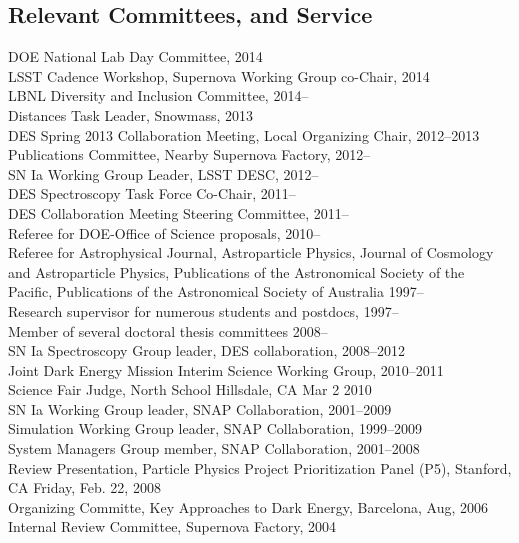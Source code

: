 \documentclass[line, margin]{res}
\begin{document}
\begin{resume}
\section{Relevant Committees, and Service}
DOE National Lab Day Committee, 2014\\
LSST Cadence Workshop, Supernova Working Group co-Chair, 2014\\
LBNL Diversity and Inclusion Committee, 2014--\\
Distances Task Leader, Snowmass, 2013\\
DES Spring 2013 Collaboration Meeting, Local Organizing Chair, 2012--2013\\
Publications Committee, Nearby Supernova Factory, 2012--\\
SN Ia Working Group Leader, LSST DESC, 2012--\\
DES Spectroscopy Task Force Co-Chair, 2011--\\
DES Collaboration Meeting Steering Committee, 2011--\\
Referee for DOE-Office of Science proposals, 2010-- \\
Referee for Astrophysical Journal, Astroparticle Physics, Journal of Cosmology and Astroparticle Physics, Publications of the Astronomical Society of the Pacific, Publications of the Astronomical Society of Australia 1997--\\
Research supervisor for numerous students and postdocs, 1997--\\
Member of several doctoral thesis committees 2008--\\
SN Ia Spectroscopy Group leader, DES collaboration, 2008--2012\\
Joint Dark Energy Mission Interim Science Working Group, 2010--2011\\
Science Fair Judge, North School Hillsdale, CA Mar 2 2010\\
SN Ia Working Group leader, SNAP Collaboration, 2001--2009\\
Simulation Working Group leader, SNAP Collaboration, 1999--2009\\
System Managers Group member, SNAP Collaboration, 2001--2008\\
Review Presentation, Particle Physics Project Prioritization Panel (P5), Stanford, CA Friday, Feb. 22, 2008\\
Organizing Committe, Key Approaches to Dark Energy, Barcelona,  Aug, 2006\\
Internal Review Committee, Supernova Factory, 2004


\end{resume}
\end{document}
